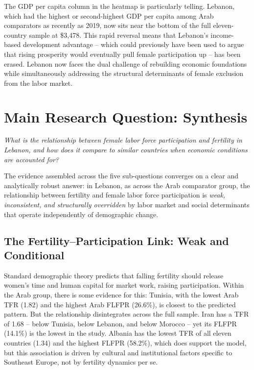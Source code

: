 \documentclass[12pt,a4paper]{article}
\begin{document}
The GDP per capita column in the heatmap is particularly telling. Lebanon, which had the highest or second-highest GDP per capita among Arab comparators as recently as 2019, now sits near the bottom of the full eleven-country sample at \$3{,}478. This rapid reversal means that Lebanon's income-based development advantage -- which could previously have been used to argue that rising prosperity would eventually pull female participation up -- has been erased. Lebanon now faces the dual challenge of rebuilding economic foundations while simultaneously addressing the structural determinants of female exclusion from the labor market.

\section{Main Research Question: Synthesis}
\label{sec:synthesis}

\textit{What is the relationship between female labor force participation and fertility in Lebanon, and how does it compare to similar countries when economic conditions are accounted for?}

The evidence assembled across the five sub-questions converges on a clear and analytically robust answer: in Lebanon, as across the Arab comparator group, the relationship between fertility and female labor force participation is \textit{weak, inconsistent, and structurally overridden} by labor market and social determinants that operate independently of demographic change.

\subsection{The Fertility--Participation Link: Weak and Conditional}

Standard demographic theory predicts that falling fertility should release women's time and human capital for market work, raising participation. Within the Arab group, there is some evidence for this: Tunisia, with the lowest Arab TFR (1.82) and the highest Arab FLFPR (26.6\%), is closest to the predicted pattern. But the relationship disintegrates across the full sample. Iran has a TFR of 1.68 -- below Tunisia, below Lebanon, and below Morocco -- yet its FLFPR (14.1\%) is the lowest in the study. Albania has the lowest TFR of all eleven countries (1.34) and the highest FLFPR (58.2\%), which does support the model, but this association is driven by cultural and institutional factors specific to Southeast Europe, not by fertility dynamics per se.
\end{document}
